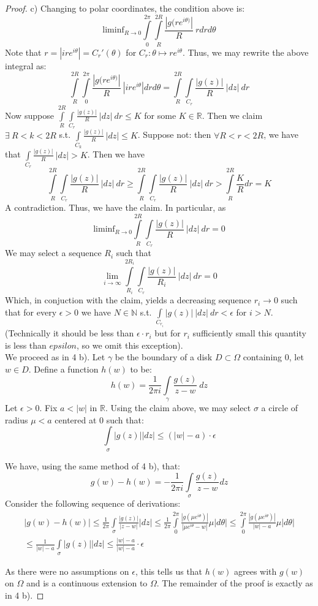 \documentclass{article}
\newcommand{\bb}[1]{\mathbb{#1}}
\begin{document}
\begin{proof}
  c) Changing to polar coordinates, the condition above is:
  \[
    \text{liminf}_{R\to 0} \int\limits_{0}^{2 \pi}\int\limits_{R}^{2R}\frac{|g(re^{i\theta)}|}{R} \ r dr d\theta
  \]
  Note that $r = |ire^{i\theta}| = C_{r}'(\theta)$ for $C_{r}: \theta \mapsto re^{i\theta}$. Thus, we may rewrite the above integral as:
  \[
    \int\limits_{R}^{2 R}\int\limits_{0}^{2\pi}\frac{|g(re^{i\theta)}|}{R} \ |ire^{i\theta}| dr d\theta = \int\limits_{R}^{2 R}\int\limits_{C_{r}}\frac{|g(z)|}{R} \ |dz|\  dr
  \]
  Now suppose $\int\limits_{R}^{2 R}\int\limits_{C_{r}}\frac{|g(z)|}{R} \ |dz|\  dr \leq K$ for some $K \in \bb{R}$. Then we claim $\exists \ R<k<2R$ s.t. $\int\limits_{C_{k}}\frac{|g(z)|}{R} \ |dz| \leq K$. Suppose not: then $\forall R<r<2R$, we have that $\int\limits_{C_{r}}\frac{|g(z)|}{R} \ |dz| > K$. Then we have
  \[
    \int\limits_{R}^{2 R}\int\limits_{C_{r}}\frac{|g(z)|}{R} \ |dz|\  dr \geq \int\limits_{R}^{2 R}\int\limits_{C_{r}}\frac{|g(z)|}{R} \ |dz|\  dr > \int\limits_{R}^{2 R}\frac{K}{R}  dr = K
  \]
  A contradiction. Thus, we have the claim. In particular, as
  \[
    \text{liminf}_{R\to 0}\int\limits_{R}^{2 R}\int\limits_{C_{r}}\frac{|g(z)|}{R} \ |dz|\  dr = 0
  \]
  We may select a sequence $R_{i}$ such that
  \[
    \lim_{i \to \infty}\int\limits_{R_{i}}^{2 R_{i}}\int\limits_{C_{r}}\frac{|g(z)|}{R_{i}} \ |dz|\  dr = 0
  \]
  Which, in conjuction with the claim, yields a decreasing sequence $r_{i} \to 0$ such that for every $\epsilon > 0$ we have $N \in \bb{N}$ s.t. $\int\limits_{C_{r_{i}}}|g(z)| \ |dz|\  dr < \epsilon$ for $i > N$.  (Technically it should be less than $\epsilon \cdot r_{i}$ but for $r_{i}$ sufficiently small this quantity is less than $epsilon$, so we omit this exception). \\
  We proceed as in 4 b). Let $\gamma$ be the boundary of a disk $D \subset \Omega$ containing $0$, let $w \in D$. Define a function $h(w)$ to be:
  \[
    h(w) = \frac{1}{2\pi i}\int\limits_{\gamma} \frac{g(z)}{z-w} \ dz
  \]
  Let $\epsilon>0$. Fix $a < |w|$ in $\bb{R}$. Using the claim above, we may select $\sigma$ a circle of radius $\mu < a$ centered at $0$ such that:
  \[
    \int\limits_{\sigma}|g(z)| |dz| \leq (|w| - a) \cdot \epsilon
  \]
 
  We have, using the same method of 4 b), that:
  \[
     g(w) - h(w) = -\frac{1}{2\pi i}\int\limits_{\sigma} \frac{g(z)}{z-w}dz
   \]
   Consider the following sequence of derivations:
   \begin{align*}
     |g(w) - h(w)| \leq \frac{1}{2\pi}\int\limits_{\sigma} \frac{|g(z)|}{|z-w|}|dz| \leq \frac{1}{2 \pi} \int\limits_{0}^{2 \pi}\frac{|g(\mu e^{i\theta})|}{|\mu e^{i\theta} - w|}\mu |d\theta| \leq \int\limits_{0}^{2 \pi}\frac{|g(\mu e^{i\theta})|}{|w| - a}\mu |d\theta| \\
     \leq \frac{1}{|w| - a} \int\limits_{\sigma}|g(z)||dz| \leq \frac{|w|-a}{|w|-a} \cdot \epsilon
   \end{align*}
   
   As there were no assumptions on $\epsilon$, this tells us that $h(w)$ agrees with $g(w)$ on $\Omega$ and is a continuous extension to $\Omega$. The remainder of the proof is exactly as in 4 b).  
\end{proof}
\end{document}
